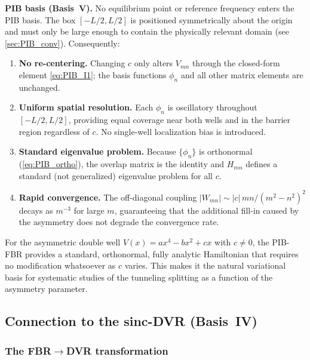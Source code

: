 \textbf{PIB basis (Basis~V).}
No equilibrium point or reference frequency enters the PIB basis.  The box
$[-L/2, L/2]$ is positioned symmetrically about the origin and must only be
large enough to contain the physically relevant domain (see \cref{sec:PIB_conv}).
Consequently:
\begin{enumerate}
  \item \textbf{No re-centering.}  Changing $c$ only alters $V_{mn}$ through
        the closed-form element \cref{eq:PIB_I1}; the basis functions $\phi_n$
        and all other matrix elements are unchanged.
  \item \textbf{Uniform spatial resolution.}  Each $\phi_n$ is oscillatory
        throughout $[-L/2, L/2]$, providing equal coverage near both wells and
        in the barrier region regardless of $c$.  No single-well localization
        bias is introduced.
  \item \textbf{Standard eigenvalue problem.}  Because $\{\phi_n\}$ is
        orthonormal (\cref{eq:PIB_ortho}), the overlap matrix is the identity and
        $H_{mn}$ defines a standard (not generalized) eigenvalue problem for all $c$.
  \item \textbf{Rapid convergence.}  The off-diagonal coupling
        $|W_{mn}| \sim |c|\,mn/(m^2-n^2)^2$ decays as $m^{-3}$ for large $m$,
        guaranteeing that the additional fill-in caused by the asymmetry does not
        degrade the convergence rate.
\end{enumerate}

\begin{result}
For the asymmetric double well $V(x) = ax^4 - bx^2 + cx$ with $c \neq 0$,
the PIB-FBR provides a standard, orthonormal, fully analytic Hamiltonian that
requires no modification whatsoever as $c$ varies.  This makes it the natural
variational basis for systematic studies of the tunneling splitting as a function
of the asymmetry parameter.
\end{result}

\subsection{Connection to the sinc-DVR (Basis~IV)}\label{sec:PIB_DVR}

\subsubsection{The FBR$\to$DVR transformation}

